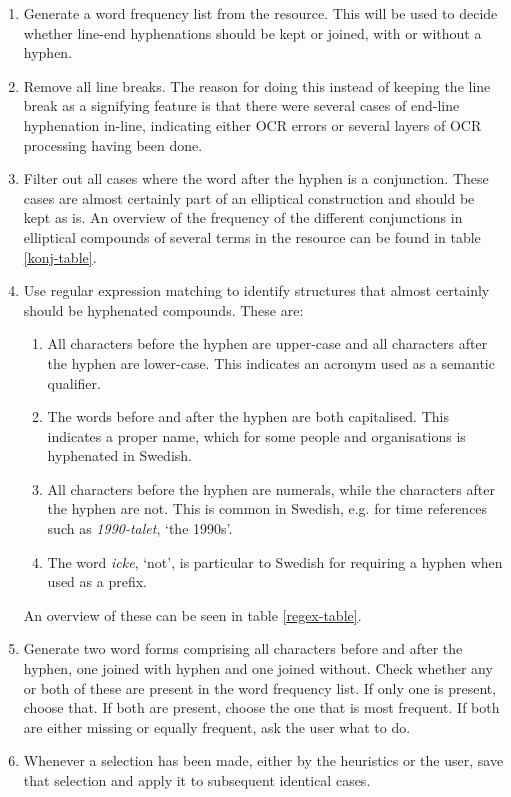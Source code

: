 \begin{enumerate}
    \item Generate a word frequency list from the resource. This will be used to decide whether line-end hyphenations should be kept or joined, with or without a hyphen.
    \item Remove all line breaks. The reason for doing this instead of keeping the line break as a signifying feature is that there were several cases of end-line hyphenation in-line, indicating either OCR errors or several layers of OCR processing having been done.
    \item Filter out all cases where the word after the hyphen is a conjunction. These cases are almost certainly part of an elliptical construction and should be kept as is. An overview of the frequency of the different conjunctions in elliptical compounds of several terms in the resource can be found in table \ref{konj-table}.
    \item Use regular expression matching to identify structures that almost certainly should be hyphenated compounds. These are:
    \begin{enumerate}
        \item All characters before the hyphen are upper-case and all characters after the hyphen are lower-case. This indicates an acronym used as a semantic qualifier.
        \item The words before and after the hyphen are both capitalised. This indicates a proper name, which for some people and organisations is hyphenated in Swedish.
        \item All characters before the hyphen are numerals, while the characters after the hyphen are not. This is common in Swedish, e.g. for time references such as \emph{1990-talet}, `the 1990s'.
        \item The word \emph{icke}, `not', is particular to Swedish for requiring a hyphen when used as a prefix.
    \end{enumerate}
    An overview of these can be seen in table \ref{regex-table}.
    \item Generate two word forms comprising all characters before and after the hyphen, one joined with hyphen and one joined without. Check whether any or both of these are present in the word frequency list. If only one is present, choose that. If both are present, choose the one that is most frequent. If both are either missing or equally frequent, ask the user what to do.
    \item Whenever a selection has been made, either by the heuristics or the user, save that selection and apply it to subsequent identical cases.
\end{enumerate}


